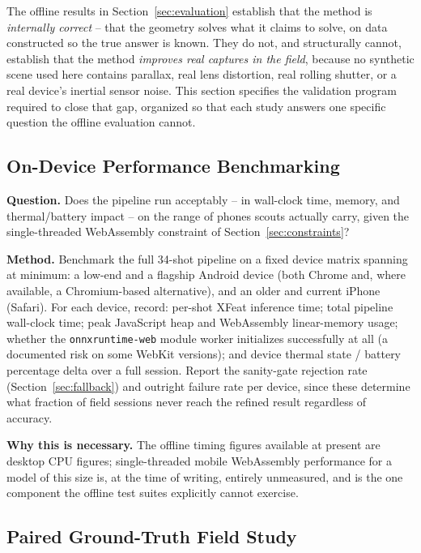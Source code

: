 \documentclass[11pt]{article}
\begin{document}
The offline results in Section~\ref{sec:evaluation} establish that the method is \emph{internally correct} -- that the geometry solves what it claims to solve, on data constructed so the true answer is known. They do not, and structurally cannot, establish that the method \emph{improves real captures in the field}, because no synthetic scene used here contains parallax, real lens distortion, real rolling shutter, or a real device's inertial sensor noise. This section specifies the validation program required to close that gap, organized so that each study answers one specific question the offline evaluation cannot.

\subsection{On-Device Performance Benchmarking}
\label{sec:val-perf}

\textbf{Question.} Does the pipeline run acceptably -- in wall-clock time, memory, and thermal/battery impact -- on the range of phones scouts actually carry, given the single-threaded WebAssembly constraint of Section~\ref{sec:constraints}?

\textbf{Method.} Benchmark the full 34-shot pipeline on a fixed device matrix spanning at minimum: a low-end and a flagship Android device (both Chrome and, where available, a Chromium-based alternative), and an older and current iPhone (Safari). For each device, record: per-shot XFeat inference time; total pipeline wall-clock time; peak JavaScript heap and WebAssembly linear-memory usage; whether the \texttt{onnxruntime-web} module worker initializes successfully at all (a documented risk on some WebKit versions); and device thermal state / battery percentage delta over a full session. Report the sanity-gate rejection rate (Section~\ref{sec:fallback}) and outright failure rate per device, since these determine what fraction of field sessions never reach the refined result regardless of accuracy.

\textbf{Why this is necessary.} The offline timing figures available at present are desktop CPU figures; single-threaded mobile WebAssembly performance for a model of this size is, at the time of writing, entirely unmeasured, and is the one component the offline test suites explicitly cannot exercise.

\subsection{Paired Ground-Truth Field Study}
\label{sec:val-paired}
\end{document}
